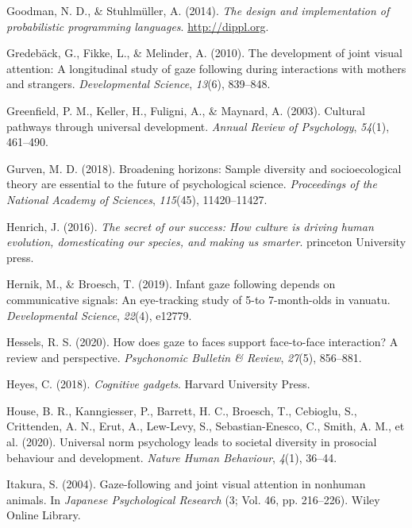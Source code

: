 \documentclass[
  man,floatsintext]{apa7}
\newlength{\cslhangindent}
\newenvironment{CSLReferences}[2] %
 {\begin{list}{}{%
  \setlength{\itemindent}{0pt}
  \setlength{\leftmargin}{0pt}
  \setlength{\parsep}{0pt}
  \ifodd #1
   \setlength{\leftmargin}{\cslhangindent}
   \setlength{\itemindent}{-1\cslhangindent}
  \fi
  \setlength{\itemsep}{#2\baselineskip}}}
 {\end{list}}
\begin{document}
\begin{CSLReferences}{1}{0}
Goodman, N. D., \& Stuhlmüller, A. (2014). \emph{{The design and implementation of probabilistic programming languages}}. \url{http://dippl.org}.

Gredebäck, G., Fikke, L., \& Melinder, A. (2010). The development of joint visual attention: A longitudinal study of gaze following during interactions with mothers and strangers. \emph{Developmental Science}, \emph{13}(6), 839--848.

Greenfield, P. M., Keller, H., Fuligni, A., \& Maynard, A. (2003). Cultural pathways through universal development. \emph{Annual Review of Psychology}, \emph{54}(1), 461--490.

Gurven, M. D. (2018). Broadening horizons: Sample diversity and socioecological theory are essential to the future of psychological science. \emph{Proceedings of the National Academy of Sciences}, \emph{115}(45), 11420--11427.

Henrich, J. (2016). \emph{The secret of our success: How culture is driving human evolution, domesticating our species, and making us smarter}. princeton University press.

Hernik, M., \& Broesch, T. (2019). Infant gaze following depends on communicative signals: An eye-tracking study of 5-to 7-month-olds in vanuatu. \emph{Developmental Science}, \emph{22}(4), e12779.

Hessels, R. S. (2020). How does gaze to faces support face-to-face interaction? A review and perspective. \emph{Psychonomic Bulletin \& Review}, \emph{27}(5), 856--881.

Heyes, C. (2018). \emph{Cognitive gadgets}. Harvard University Press.

House, B. R., Kanngiesser, P., Barrett, H. C., Broesch, T., Cebioglu, S., Crittenden, A. N., Erut, A., Lew-Levy, S., Sebastian-Enesco, C., Smith, A. M., et al. (2020). Universal norm psychology leads to societal diversity in prosocial behaviour and development. \emph{Nature Human Behaviour}, \emph{4}(1), 36--44.

Itakura, S. (2004). Gaze-following and joint visual attention in nonhuman animals. In \emph{Japanese Psychological Research} (3; Vol. 46, pp. 216--226). Wiley Online Library.


\end{CSLReferences}
\end{document}
